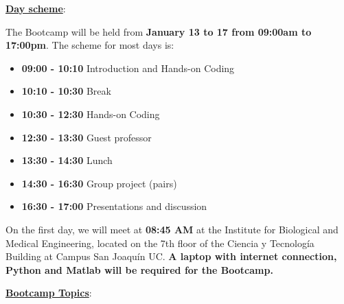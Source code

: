 \documentclass[letter,11pt]{article}
\begin{document}
\underline{\textbf{Day scheme}}:

The Bootcamp will be held from \textbf{January 13 to 17 from 09:00am to 17:00pm}. The scheme for most days is:

\begin{itemize}
    \itemsep-0.3em 
    \item \textbf{09:00 - 10:10} \Large Introduction and Hands-on Coding \large
    \item \textbf{10:10 - 10:30} \Large Break \large
    \item \textbf{10:30 - 12:30} \Large Hands-on Coding \large
    \item \textbf{12:30 - 13:30} \Large Guest professor\large
    \item \textbf{13:30 - 14:30} \Large Lunch \large
    \item \textbf{14:30 - 16:30} \Large Group project (pairs) \large
    \item \textbf{16:30 - 17:00} \Large Presentations and discussion \large
    
\end{itemize}

On the first day, we will meet at \textbf{08:45 AM} at the Institute for Biological and Medical Engineering, located on the 7th floor of the Ciencia y Tecnología Building at Campus San Joaquín UC. \textbf{A laptop with internet connection, Python and Matlab will be required for the Bootcamp.} 



\newpage
\underline{\textbf{Bootcamp Topics}}:
\end{document}
